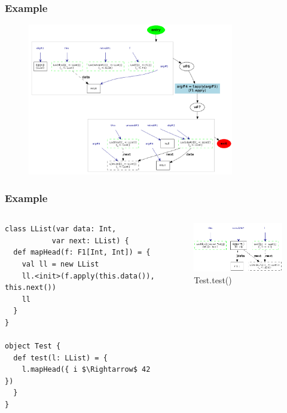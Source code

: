 \documentclass[hyperref={pdfpagelabels=false}]{beamer}
\begin{document}
\begin{frame}[fragile]
\frametitle{Example}
  \begin{figure}[t]
    \begin{center}
    \includegraphics[width=90mm]{images/e4.png}\\
    \end{center}
  \end{figure}
\end{frame}

\begin{frame}[fragile]
\frametitle{Example}
  \begin{columns}
    \begin{column}{0.4\textwidth}
\begin{lstlisting}[escapechar=\%]
class LList(var data: Int,
           var next: LList) {
  def mapHead(f: F1[Int, Int]) = {
    val ll = new LList
    ll.<init>(f.apply(this.data()), this.next())
    ll
  }
}

object Test {
  def test(l: LList) = {
    l.mapHead({ i $\Rightarrow$ 42 })
  }
}
\end{lstlisting}
    \end{column}
    \begin{column}{0.6\textwidth}
      \begin{figure}[t]
        \begin{center}
        \includegraphics[width=60mm]{images/e5.png}\\
        Test.test()
        \end{center}
      \end{figure}
    \end{column}
  \end{columns}
\end{frame}
\end{document}
